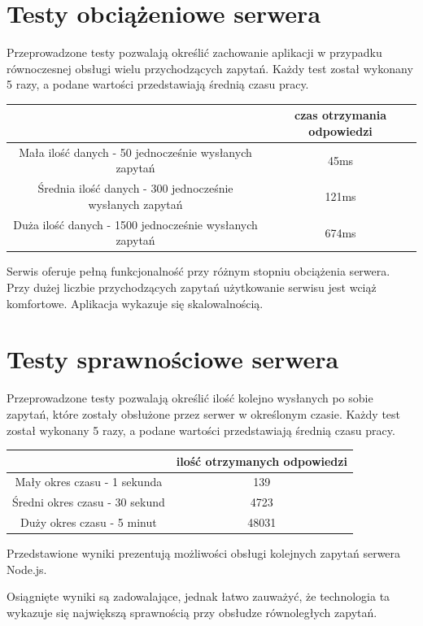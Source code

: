 \documentclass[12pt]{report}
\begin{document}
\section{Testy obciążeniowe serwera}
Przeprowadzone testy pozwalają określić zachowanie aplikacji w przypadku równoczesnej obsługi wielu przychodzących zapytań.
Każdy test został wykonany 5 razy, a podane wartości przedstawiają średnią czasu pracy.
\smallskip
\begin{center}
  \begin{tabular}{ | c | c | }
    \hline
    & czas otrzymania odpowiedzi \\
    \hline
	Mała ilość danych - 50 jednocześnie wysłanych zapytań & 45ms \\
	\hline
	Średnia ilość danych - 300 jednocześnie wysłanych zapytań & 121ms \\
	\hline
	Duża ilość danych - 1500 jednocześnie wysłanych zapytań & 674ms \\
    \hline
  \end{tabular}
\end{center}
\bigskip\medskip

Serwis oferuje pełną funkcjonalność przy różnym stopniu obciążenia serwera.
Przy dużej liczbie przychodzących zapytań użytkowanie serwisu jest wciąż komfortowe.
Aplikacja wykazuje się skalowalnością.

\section{Testy sprawnościowe serwera}
Przeprowadzone testy pozwalają określić ilość kolejno wysłanych po sobie zapytań, które zostały obsłużone przez serwer w określonym czasie.
Każdy test został wykonany 5 razy, a podane wartości przedstawiają średnią czasu pracy.
\bigskip \medskip
\begin{center}
  \begin{tabular}{ | c | c | }
    \hline
    & ilość otrzymanych odpowiedzi\\
    \hline
	Mały okres czasu - 1 sekunda & 139 \\
	\hline
	Średni okres czasu - 30 sekund & 4723 \\
	\hline
	Duży okres czasu - 5 minut & 48031 \\
    \hline
  \end{tabular}
\end{center}
\bigskip \medskip
Przedstawione wyniki prezentują możliwości obsługi kolejnych zapytań serwera Node.js.

Osiągnięte wyniki są zadowalające, jednak łatwo zauważyć, że technologia ta wykazuje się największą sprawnością przy obsłudze równoległych zapytań.
\end{document}
